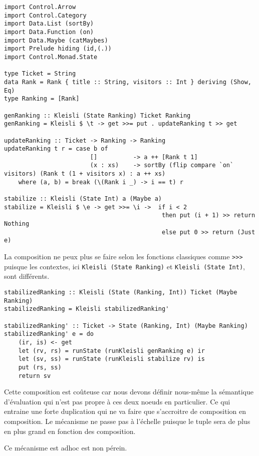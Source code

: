\documentclass{llncs}
\begin{document}
\begin{lstlisting}
import Control.Arrow
import Control.Category
import Data.List (sortBy)
import Data.Function (on)
import Data.Maybe (catMaybes)
import Prelude hiding (id,(.))
import Control.Monad.State

type Ticket = String
data Rank = Rank { title :: String, visitors :: Int } deriving (Show, Eq)
type Ranking = [Rank]

genRanking :: Kleisli (State Ranking) Ticket Ranking
genRanking = Kleisli $ \t -> get >>= put . updateRanking t >> get

updateRanking :: Ticket -> Ranking -> Ranking
updateRanking t r = case b of
                        []          -> a ++ [Rank t 1]
                        (x : xs)    -> sortBy (flip compare `on` visitors) (Rank t (1 + visitors x) : a ++ xs)
    where (a, b) = break (\(Rank i _) -> i == t) r

stabilize :: Kleisli (State Int) a (Maybe a)
stabilize = Kleisli $ \e -> get >>= \i ->  if i < 2
                                            then put (i + 1) >> return Nothing
                                            else put 0 >> return (Just e)
\end{lstlisting}

La composition ne peux plus se faire selon les fonctions classiques comme \lstinline{>>>}
puisque les contextes, ici \lstinline{Kleisli (State Ranking)} et \lstinline{Kleisli (State Int)},
sont différents.

\begin{lstlisting}
stabilizedRanking :: Kleisli (State (Ranking, Int)) Ticket (Maybe Ranking)
stabilizedRanking = Kleisli stabilizedRanking'

stabilizedRanking' :: Ticket -> State (Ranking, Int) (Maybe Ranking)
stabilizedRanking' e = do
    (ir, is) <- get
    let (rv, rs) = runState (runKleisli genRanking e) ir
    let (sv, ss) = runState (runKleisli stabilize rv) is
    put (rs, ss)
    return sv
\end{lstlisting}

Cette composition est coûteuse car nous devons définir nous-même la sémantique
d'évaluation qui n'est pas propre à ces deux noeuds en particulier.
Ce qui entraine une forte duplication qui ne va faire que s'accroitre de
composition en composition.
Le mécanisme ne passe pas à l'échelle puisque le tuple sera de plus en plus
grand en fonction des composition.

Ce mécanisme est adhoc est non pérein.

\begin{lstlisting}
\end{lstlisting}
\end{document}
